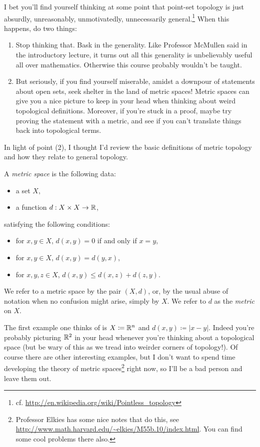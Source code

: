 I bet you'll find yourself thinking at some point that point-set
topology is just absurdly, unreasonably, unmotivatedly, unnecessarily
general.\footnote{cf.
  \url{http://en.wikipedia.org/wiki/Pointless_topology}} When this
happens, do two things:
\begin{enumerate}
\item Stop thinking that. Bask in the generality. Like Professor
  McMullen said in the introductory lecture, it turns out all this
  generality is unbelievably useful all over mathematics. Otherwise
  this course probably wouldn't be taught.
\item But seriously, if you find yourself miserable, amidst a downpour
  of statements about open sets, seek shelter in the land of metric
  spaces! Metric spaces can give you a nice picture to keep in your
  head when thinking about weird topological definitions. Moreover, if
  you're stuck in a proof, maybe try proving the statement with a
  metric, and see if you can't translate things back into topological
  terms.
\end{enumerate}
In light of point (2), I thought I'd review the basic definitions of
metric topology and how they relate to general topology.

\begin{definition}
  A \textit{metric space} is the following data:
  \begin{itemize}
  \item a set $X$,
  \item a function $d : X \times X \to \mathbb{R}$,
  \end{itemize}
  satisfying the following conditions:
  \begin{itemize}
  \item for $x,y \in X$, $d(x,y) = 0$ if and only if $x = y$,
  \item for $x,y \in X$, $d(x,y) = d(y,x)$,
  \item for $x,y,z \in X$, $d(x,y) \le d(x,z) + d(z,y)$.
  \end{itemize}
  We refer to a metric space by the pair $(X, d)$, or, by the usual
  abuse of notation when no confusion might arise, simply by $X$. We
  refer to $d$ as the \textit{metric} on $X$.
\end{definition}

\begin{example}
  The first example one thinks of is $X \coloneqq \mathbb{R}^n$ and $d(x,y)
  \coloneqq |x-y|$. Indeed you're probably picturing $\mathbb{R}^2$ in your
  head whenever you're thinking about a topological space (but be wary
  of this as we tread into weirder corners of topology!). Of course
  there are other interesting examples, but I don't want to spend time
  developing the theory of metric spaces\footnote{Professor Elkies has
    some nice notes that do this, see
    \url{http://www.math.harvard.edu/~elkies/M55b.10/index.html}. You
    can find some cool problems there also.} right now, so I'll be a
  bad person and leave them out.
\end{example}

